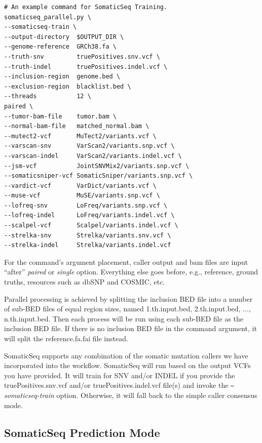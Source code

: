 \documentclass[10pt,letterpaper]{article}
\begin{document}
\begin{sloppypar}
\begin{lstlisting}
# An example command for SomaticSeq Training.
somaticseq_parallel.py \
--somaticseq-train \
--output-directory  $OUTPUT_DIR \
--genome-reference  GRCh38.fa \
--truth-snv         truePositives.snv.vcf \
--truth-indel       truePositives.indel.vcf \
--inclusion-region  genome.bed \
--exclusion-region  blacklist.bed \
--threads           12 \
paired \
--tumor-bam-file    tumor.bam \
--normal-bam-file   matched_normal.bam \
--mutect2-vcf       MuTect2/variants.vcf \
--varscan-snv       VarScan2/variants.snp.vcf \
--varscan-indel     VarScan2/variants.indel.vcf \
--jsm-vcf           JointSNVMix2/variants.snp.vcf \
--somaticsniper-vcf SomaticSniper/variants.snp.vcf \
--vardict-vcf       VarDict/variants.vcf \
--muse-vcf          MuSE/variants.snp.vcf \
--lofreq-snv        LoFreq/variants.snp.vcf \
--lofreq-indel      LoFreq/variants.indel.vcf \
--scalpel-vcf       Scalpel/variants.indel.vcf \
--strelka-snv       Strelka/variants.snv.vcf \
--strelka-indel     Strelka/variants.indel.vcf
\end{lstlisting}

For the command's argument placement, caller output and bam files are input ``after'' \textit{paired} or \textit{single} option. Everything else goes before, e.g., reference, ground truths, resources such as dbSNP and COSMIC, etc. 

Parallel processing is achieved by splitting the inclusion BED file into a number of sub-BED files of equal region sizes, named 1.th.input.bed, 2.th.input.bed, ..., n.th.input.bed. Then each process will be run using each sub-BED file as the inclusion BED file. If there is no inclusion BED file in the command argument, it will split the reference.fa.fai file instead. 

SomaticSeq supports any combination of the somatic mutation callers we have incorporated into the workflow. SomaticSeq will run based on the output VCFs you have provided. It will train for SNV and/or INDEL if you provide the truePositives.snv.vcf and/or truePositives.indel.vcf file(s) and invoke the \textit{\texttt{--}somaticseq-train} option. Otherwise, it will fall back to the simple caller consensus mode.




\subsection{SomaticSeq Prediction Mode} \label{somaticseq_prediction}


\end{sloppypar}
\end{document}
